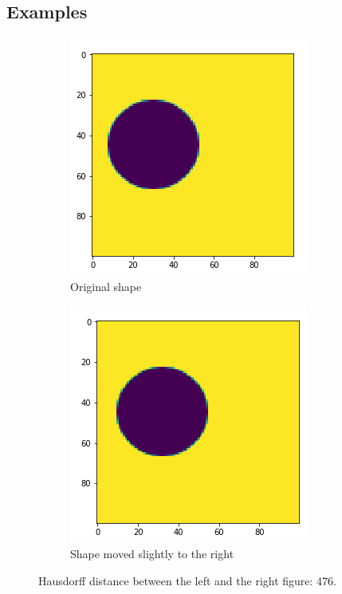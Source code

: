 \subsection{Examples}
\begin{figure}[H]
    \centering
    \begin{subfigure}{.5\textwidth}
        \centering
        \includegraphics[width=.75\linewidth]{chapters/06_hdm/images/hdm_original.png}
        \caption{Original shape}
    \end{subfigure}%
    \begin{subfigure}{.5\textwidth}
        \centering
        \includegraphics[width=.75\linewidth]{chapters/06_hdm/images/hdm_moved1.png}
        \caption{Shape moved slightly to the right}
    \end{subfigure}
    \caption{Hausdorff distance between the left and the right figure: 476. }
    \label{hdm_moved1}
\end{figure}


